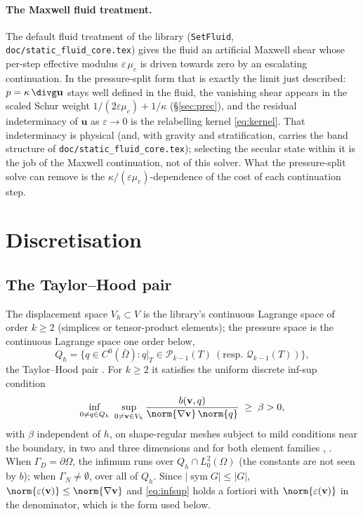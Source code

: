 \documentclass[11pt]{article}
\numberwithin{equation}{section}
\theoremstyle{remark}
\newcommand{\eps}{\varepsilon}
\newcommand{\sym}{\operatorname{sym}}
\newcommand{\vu}{\mathbf{u}}
\newcommand{\vv}{\mathbf{v}}
\newcommand{\Vh}{V_h}
\newcommand{\Qh}{Q_h}
\newcommand{\code}[1]{\texttt{#1}}
\begin{document}
\paragraph{The Maxwell fluid treatment.} The default fluid treatment of
the library (\code{SetFluid}, \code{doc/static\_fluid\_core.tex}) gives
the fluid an artificial Maxwell shear whose per-step effective modulus
$\eps\,\mu_c$ is driven towards zero by an escalating continuation. In
the pressure-split form that is exactly the limit just described: $p =
\kappa\,\divg\vu$ stays well defined in the fluid, the vanishing shear
appears in the scaled Schur weight $1/(2\eps\mu_c) + 1/\kappa$
(\S\ref{sec:prec}), and the residual indeterminacy of $\vu$ as $\eps\to0$ is
the relabelling kernel \eqref{eq:kernel}. That indeterminacy is physical
(and, with gravity and stratification, carries the band structure of
\code{doc/static\_fluid\_core.tex}); selecting the secular state within
it is the job of the Maxwell continuation, not of this solver. What the
pressure-split solve can remove is the $\kappa/(\eps\mu_c)$-dependence of
the cost of each continuation step.

\section{Discretisation}
\label{sec:disc}

\subsection{The Taylor--Hood pair}

The displacement space $\Vh\subset V$ is the library's continuous
Lagrange space of order $k\ge2$ (simplices or tensor-product elements);
the pressure space is the continuous Lagrange space one order below,
\begin{equation}
  \Qh = \{ q\in C^0(\bar\Omega) : q|_T\in\mathcal P_{k-1}(T)\
  (\text{resp. } \mathcal Q_{k-1}(T)) \},
\end{equation}
the Taylor--Hood pair \cite{TaylorHood}. For $k\ge2$ it satisfies the
uniform discrete inf-sup condition
\begin{equation}
  \inf_{0\ne q\in\Qh}\ \sup_{0\ne\vv\in\Vh}
  \frac{b(\vv,q)}{\norm{\nabla\vv}\,\norm{q}} \;\ge\; \beta > 0,
  \label{eq:infsup}
\end{equation}
with $\beta$ independent of $h$, on shape-regular meshes subject to mild
conditions near the boundary, in two and three dimensions and for both
element families \cite[\S8.8]{BBF}, \cite{Stenberg1984,Boffi1997}. When
$\Gamma_D = \partial\Omega$, the infimum runs over $\Qh\cap L^2_0(\Omega)$
(the constants are not seen by $b$); when $\Gamma_N\ne\emptyset$, over all
of $\Qh$. Since $|\sym G|\le|G|$, $\norm{\eps(\vv)}\le\norm{\nabla\vv}$
and \eqref{eq:infsup} holds a fortiori with $\norm{\eps(\vv)}$ in the
denominator, which is the form used below.
\end{document}
